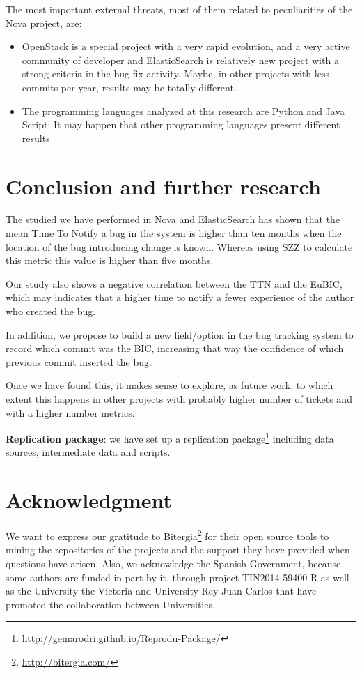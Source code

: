 \documentclass[10pt, conference]{IEEEtran}
\begin{document}
The most important external threats, most of them related to peculiarities of the Nova project, are:

\begin{itemize}
    \item OpenStack is a special project with a very rapid evolution, and a very active community of developer and ElasticSearch is relatively new project with a strong criteria in the bug fix activity. Maybe, in other projects with less commits per year, results may be totally different.
    \item The programming languages analyzed at this research are Python and Java Script: It may happen that other programming languages present different results
\end{itemize}

\section{Conclusion and further research}
\label{sec:conclusions}

The studied we have performed in Nova and ElasticSearch has shown that the mean Time To Notify a bug in the system is higher than ten months when the location of the bug introducing change is known. Whereas using SZZ to calculate this metric this value is higher than five months.

Our study also shows a negative correlation between the TTN and the EuBIC, which may indicates that a higher time to notify a fewer experience of the author who created the bug. 

In addition, we propose to build a new field/option in the bug tracking system to record which commit was the BIC, increasing that way the confidence of which previous commit inserted the bug.

Once we have found this, it makes sense to explore, as future work, to which extent this happens in other projects with probably higher number of tickets and with a higher number metrics.

\textbf{Replication package}: we have set up a replication package\footnote{\url{http://gemarodri.github.io/Reprodu-Package/}} including data sources, intermediate data and scripts.
\section*{Acknowledgment}


We want to express our gratitude to Bitergia\footnote{\url{http://bitergia.com/}} for their open source tools to mining the repositories of the projects and the support they have provided when questions have arisen. Also, we acknowledge the Spanish Government, because some authors are funded in part by it, through project TIN2014-59400-R as well as the University the Victoria and University Rey Juan Carlos that have promoted the collaboration between Universities.
\end{document}
